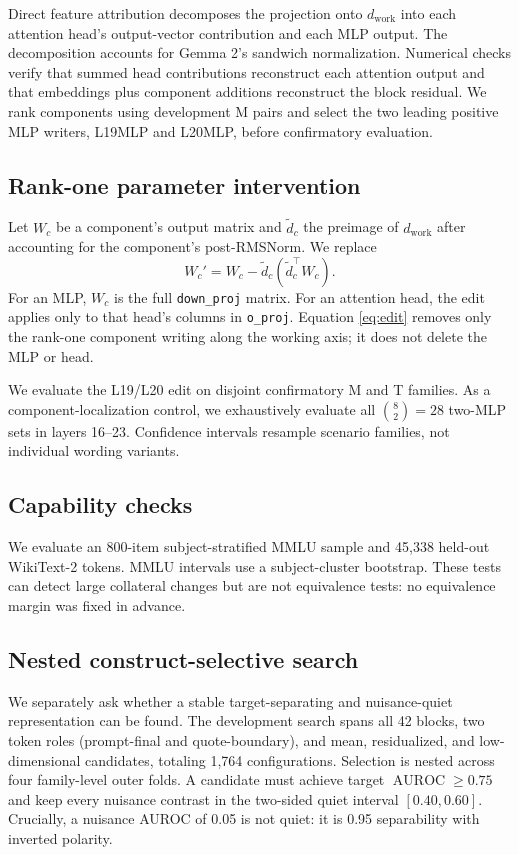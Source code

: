 \documentclass[10pt,twocolumn]{article}
\newcommand{\auc}{\operatorname{AUROC}}
\newcommand{\dwork}{d_{\mathrm{work}}}
\begin{document}
Direct feature attribution decomposes the projection onto $\dwork$ into each
attention head's output-vector contribution and each MLP output. The
decomposition accounts for Gemma 2's sandwich normalization. Numerical checks
verify that summed head contributions reconstruct each attention output and
that embeddings plus component additions reconstruct the block residual. We
rank components using development M pairs and select the two leading positive
MLP writers, L19MLP and L20MLP, before confirmatory evaluation.

\subsection{Rank-one parameter intervention}

Let $W_c$ be a component's output matrix and $\tilde d_c$ the preimage of
$\dwork$ after accounting for the component's post-RMSNorm. We replace
\begin{equation}
    W_c' = W_c - \tilde d_c(\tilde d_c^\top W_c).
    \label{eq:edit}
\end{equation}
For an MLP, $W_c$ is the full \texttt{down\_proj} matrix. For an attention head,
the edit applies only to that head's columns in \texttt{o\_proj}. Equation
\ref{eq:edit} removes only the rank-one component writing along the working
axis; it does not delete the MLP or head.

We evaluate the L19/L20 edit on disjoint confirmatory M and T families. As a
component-localization control, we exhaustively evaluate all $\binom{8}{2}=28$
two-MLP sets in layers 16--23. Confidence intervals resample scenario families,
not individual wording variants.

\subsection{Capability checks}

We evaluate an 800-item subject-stratified MMLU sample and 45,338 held-out
WikiText-2 tokens. MMLU intervals use a subject-cluster bootstrap. These tests
can detect large collateral changes but are not equivalence tests: no
equivalence margin was fixed in advance.

\subsection{Nested construct-selective search}

We separately ask whether a stable target-separating and nuisance-quiet
representation can be found. The development search spans all 42 blocks, two
token roles (prompt-final and quote-boundary), and mean, residualized, and
low-dimensional candidates, totaling 1,764 configurations. Selection is nested
across four family-level outer folds. A candidate must achieve target
$\auc\geq0.75$ and keep every nuisance contrast in the two-sided quiet interval
$[0.40,0.60]$. Crucially, a nuisance AUROC of 0.05 is not quiet: it is 0.95
separability with inverted polarity.
\end{document}
